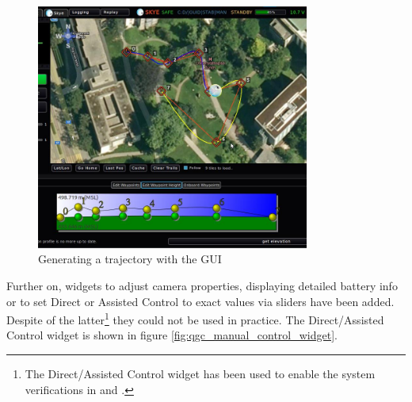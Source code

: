 \begin{figure}[H] %
	\begin{center}
		\includegraphics[width=0.8\textwidth]{qgc_automatic_control}
		\caption{Generating a trajectory with the GUI}
		\label{fig:qgc_automatic_control}		
	\end{center}
\end{figure}


Further on, widgets to adjust camera properties, displaying detailed battery info or to set Direct or Assisted Control to exact values via sliders have been added. Despite of the latter\footnote{The Direct/Assisted Control widget has been used to enable the system verifications in \cite{meiermueri} and \cite{weichart}.} they could not be used in practice. The Direct/Assisted Control widget is shown in figure \ref{fig:qgc_manual_control_widget}.

